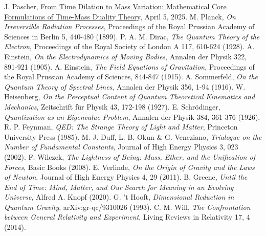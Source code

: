\documentclass[12pt,a4paper]{article}
\begin{document}
\begin{thebibliography}{99}
		 J. Pascher, \href{https://github.com/jpascher/T0-Time-Mass-Duality/tree/main/2/pdf/English/MathZeitMasseLagrangeEn.pdf}{From Time Dilation to Mass Variation: Mathematical Core Formulations of Time-Mass Duality Theory}, April 5, 2025.
		 M. Planck, \textit{On Irreversible Radiation Processes}, Proceedings of the Royal Prussian Academy of Sciences in Berlin 5, 440-480 (1899).
		 P. A. M. Dirac, \textit{The Quantum Theory of the Electron}, Proceedings of the Royal Society of London A 117, 610-624 (1928).
		 A. Einstein, \textit{On the Electrodynamics of Moving Bodies}, Annalen der Physik 322, 891-921 (1905).
		 A. Einstein, \textit{The Field Equations of Gravitation}, Proceedings of the Royal Prussian Academy of Sciences, 844-847 (1915).
		 A. Sommerfeld, \textit{On the Quantum Theory of Spectral Lines}, Annalen der Physik 356, 1-94 (1916).
		 W. Heisenberg, \textit{On the Perceptual Content of Quantum Theoretical Kinematics and Mechanics}, Zeitschrift für Physik 43, 172-198 (1927).
		 E. Schrödinger, \textit{Quantization as an Eigenvalue Problem}, Annalen der Physik 384, 361-376 (1926).
		 R. P. Feynman, \textit{QED: The Strange Theory of Light and Matter}, Princeton University Press (1985).
		 M. J. Duff, L. B. Okun \& G. Veneziano, \textit{Trialogue on the Number of Fundamental Constants}, Journal of High Energy Physics 3, 023 (2002).
		 F. Wilczek, \textit{The Lightness of Being: Mass, Ether, and the Unification of Forces}, Basic Books (2008).
		 E. Verlinde, \textit{On the Origin of Gravity and the Laws of Newton}, Journal of High Energy Physics 4, 29 (2011).
		 B. Greene, \textit{Until the End of Time: Mind, Matter, and Our Search for Meaning in an Evolving Universe}, Alfred A. Knopf (2020).
		 G. 't Hooft, \textit{Dimensional Reduction in Quantum Gravity}, arXiv:gr-qc/9310026 (1993).
		 C. M. Will, \textit{The Confrontation between General Relativity and Experiment}, Living Reviews in Relativity 17, 4 (2014).
	\end{thebibliography}
	
\end{document}
